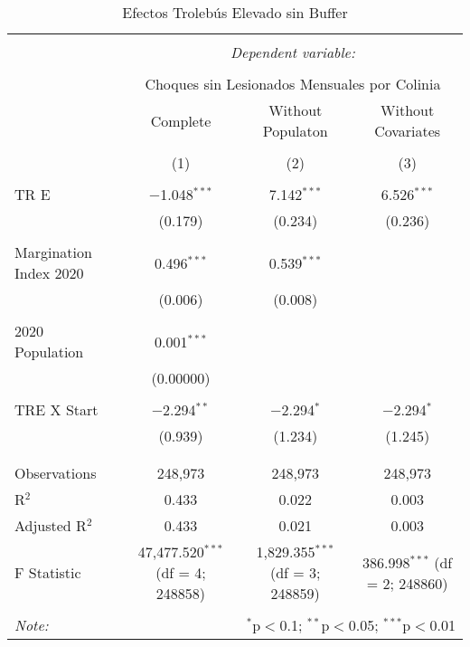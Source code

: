 
\begin{table}[!htbp] \centering 
  \caption{Efectos Trolebús Elevado sin Buffer} 
  \label{} 
\begin{tabular}{@{\extracolsep{5pt}}lccc} 
\\[-1.8ex]\hline 
\hline \\[-1.8ex] 
 & \multicolumn{3}{c}{\textit{Dependent variable:}} \\ 
\cline{2-4} 
\\[-1.8ex] & \multicolumn{3}{c}{Choques sin Lesionados Mensuales por Colinia} \\ 
 & Complete & Without Populaton & Without Covariates \\ 
\\[-1.8ex] & (1) & (2) & (3)\\ 
\hline \\[-1.8ex] 
 TR E & $-$1.048$^{***}$ & 7.142$^{***}$ & 6.526$^{***}$ \\ 
  & (0.179) & (0.234) & (0.236) \\ 
  & & & \\ 
 Margination Index 2020 & 0.496$^{***}$ & 0.539$^{***}$ &  \\ 
  & (0.006) & (0.008) &  \\ 
  & & & \\ 
 2020 Population & 0.001$^{***}$ &  &  \\ 
  & (0.00000) &  &  \\ 
  & & & \\ 
 TRE X Start & $-$2.294$^{**}$ & $-$2.294$^{*}$ & $-$2.294$^{*}$ \\ 
  & (0.939) & (1.234) & (1.245) \\ 
  & & & \\ 
\hline \\[-1.8ex] 
Observations & 248,973 & 248,973 & 248,973 \\ 
R$^{2}$ & 0.433 & 0.022 & 0.003 \\ 
Adjusted R$^{2}$ & 0.433 & 0.021 & 0.003 \\ 
F Statistic & 47,477.520$^{***}$ (df = 4; 248858) & 1,829.355$^{***}$ (df = 3; 248859) & 386.998$^{***}$ (df = 2; 248860) \\ 
\hline 
\hline \\[-1.8ex] 
\textit{Note:}  & \multicolumn{3}{r}{$^{*}$p$<$0.1; $^{**}$p$<$0.05; $^{***}$p$<$0.01} \\ 
\end{tabular} 
\end{table} 
